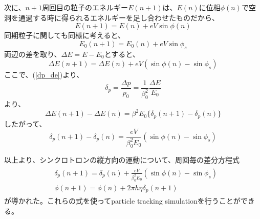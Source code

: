 \documentclass[10pt,a4paper]{ltjsarticle}
\begin{document}
次に、$n+1$周回目の粒子のエネルギー$E(n+1)$は、$E(n)$に位相$\phi(n)$で空洞を通過する時に得られるエネルギーを足し合わせたものだから、
%
\begin{equation}
  E(n+1) = E(n) + e V \sin\phi (n)
\end{equation}
%
同期粒子に関しても同様に考えると、
%
\begin{equation}
  E_0(n+1) = E_0(n) + e V \sin\phi_s
\end{equation}
%
両辺の差を取り、$\Delta E = E - E_0$とすると、
%
\begin{equation}
  \Delta E(n+1) = \Delta E(n) + e V (\sin\phi(n) - \sin\phi_s)
\end{equation}
%
ここで、(\ref{dp_de})より、
%
\begin{equation}
  \delta_p = \frac{\Delta p}{p_0} = \frac{1}{\beta_0^2}\frac{\Delta E}{E_0}
  \label{delta_p}
\end{equation}
%
より、
%
\begin{equation}
  \Delta E(n+1) - \Delta E(n) = \beta^2 E_0 \{\delta_p(n+1) - \delta_p(n)\}
\end{equation}
%
したがって、
%
\begin{equation}
  \delta_p(n+1) - \delta_p(n) = \frac{e V}{\beta_0^2 E_0}(\sin\phi(n) -\sin\phi_s)
\end{equation}
%

以上より、シンクロトロンの縦方向の運動について、周回毎の差分方程式
%
\begin{align}
  \begin{split}
     &\delta_p(n+1) = \delta_p(n) + \frac{e V}{\beta_0^2 E_0}(\sin\phi(n) -\sin\phi_s) \\
     &\phi(n+1) = \phi(n) + 2\pi h \eta \delta_p(n+1)
    \label{map}
  \end{split}
\end{align}
%
が導かれた。これらの式を使ってparticle tracking simulationを行うことができる。
\end{document}
